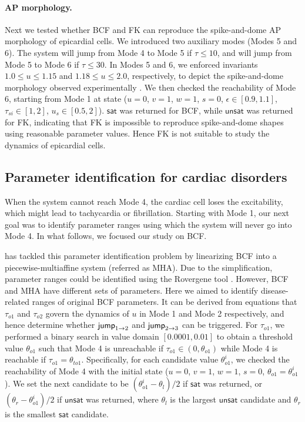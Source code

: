 \paragraph{AP morphology.}
Next we tested whether BCF and FK can reproduce the spike-and-dome AP morphology of epicardial cells. We introduced two auxiliary modes (Modes 5 and 6). The system will jump from Mode 4 to Mode 5 if $\tau \le 10$, and will jump from Mode 5 to Mode 6 if $\tau \le 30$. In Modes 5 and 6, we enforced invariants $1.0 \le u \le 1.15$ and $1.18 \le u \le 2.0$, respectively, to depict the spike-and-dome morphology observed experimentally \cite{nabauer96}. We then checked the reachability of Mode 6, starting from Mode 1 at state ($u = 0$, $v = 1$, $w = 1$, $s = 0$, $\epsilon \in [0.9,1.1]$, $\tau_{si} \in [1,2]$, $u_s \in [0.5,2]$). $\mathsf{sat}$ was returned for BCF, while $\mathsf{unsat}$ was returned for FK, indicating that FK is impossible to reproduce spike-and-dome shapes using reasonable parameter values. Hence FK is not suitable to study the dynamics of epicardial cells.



\subsection{Parameter identification for cardiac disorders}

When the system cannot reach Mode 4, the cardiac cell loses the excitability, which might lead to tachycardia or fibrillation. Starting with Mode 1, our next goal was to identify parameter ranges using which the system will never go into Mode 4. In what follows, we focused our study on BCF. 

\cite{grosu11} has tackled this parameter identification problem by linearizing BCF into a piecewise-multiaffine system (referred as MHA). Due to the simplification, parameter ranges could be identified using the Rovergene tool \cite{rovergene}. However, BCF and MHA have different sets of parameters. Here we aimed to identify disease-related ranges of original BCF parameters. It can be derived from equations that $\tau_{o1}$ and $\tau_{o2}$ govern the dynamics of $u$ in Mode 1 and Mode 2 respectively, and hence determine whether $\mathsf{jump}_{1\rightarrow 2}$ and  $\mathsf{jump}_{2\rightarrow 3}$ can be triggered. For $\tau_{o1}$, we performed a binary search in value domain $[0.0001,0.01]$ to obtain a threshold value $\theta_{o1}$ such that Mode 4 is unreachable if $\tau_{o1} \in (0, \theta_{o1})$ while Mode 4 is reachable if $\tau_{o1} =  \theta_{to1}$. Specifically, for each candidate value $\theta^i_{o1}$, we checked the reachability of Mode 4 with the initial state ($u = 0$, $v = 1$, $w = 1$, $s = 0$, $\theta_{o1} = \theta^i_{o1}$). We set the next candidate to be $(\theta^i_{o1} -\theta_{l})/2$ if $\mathsf{sat}$ was returned, or $(\theta_{r} - \theta^i_{o1})/2$ if $\mathsf{unsat}$ was returned, where $\theta_{l}$ is the largest $\mathsf{unsat}$ candidate and $\theta_{r}$ is the smallest $\mathsf{sat}$ candidate. 

